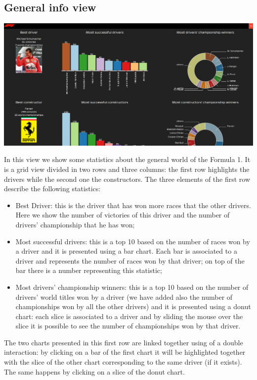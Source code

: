 \documentclass[10pt,twocolumn,letterpaper]{article}
\begin{document}
\subsection{General info view}
\begin{center}
	\centering
	\includegraphics[width=\columnwidth]{generalinfo}
\end{center}
In this view we show some statistics about the general world of the Formula 1. It is a grid view divided in two rows and three columns: the first row highlights the drivers
while the second one the constructors. The three elements of the first row describe the following statistics:
\begin{itemize}
	\item Best Driver: this is the driver that has won more races that the other drivers. Here we show the number of victories of this driver and the number of drivers'
	championship that he has won;
	\item Most successful drivers: this is a top 10 based on the number of races won by a driver and it is presented using a bar chart. Each bar is associated to a driver and
	represents the number of races won by that driver; on top of the bar there is a number representing this statistic;
	\item Most drivers' championship winners: this is a top 10 based on the number of drivers' world titles won by a driver (we have added also the number of championships
	won by all the other drivers) and it is presented using a donut chart: each slice is associated to a driver and by sliding the mouse over the slice it is possible to see the 
	number of championships won by that driver.
\end{itemize}
The two charts presented in this first row are linked together using of a double interaction: by clicking on a bar of the first chart it will be highlighted together with
the slice of the other chart corresponding to the same driver (if it exists). The same happens by clicking on a slice of the donut chart.\\
\end{document}
